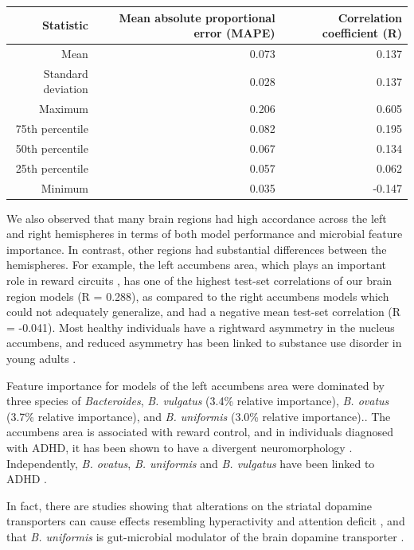 \documentclass{article}
\begin{document}
\begin{table}
    \begin{tabular}{rrr}
      \hline\hline
      \textbf{Statistic} & \textbf{Mean absolute proportional error (MAPE)} & \textbf{Correlation coefficient (R)} \\\hline
      Mean & 0.073 & 0.137 \\
      Standard deviation & 0.028 & 0.137 \\
      Maximum & 0.206 & 0.605 \\
      75th percentile & 0.082 & 0.195 \\
      50th percentile & 0.067 & 0.134 \\
      25th percentile & 0.057 & 0.062 \\
      Minimum & 0.035 & -0.147 \\\hline\hline
    \end{tabular}
\end{table}

We also observed that many brain regions had high accordance across the
left and right hemispheres in terms of both model performance and
microbial feature importance. In contrast, other regions had substantial
differences between the hemispheres. For example, the left accumbens
area, which plays an important role in reward circuits
\cite{ernstAmygdalaNucleusAccumbens2005,yauNucleusAccumbensResponse2012},
has one of the highest test-set correlations of our
brain region models (R = 0.288), as compared to the right accumbens
models which could not adequately generalize, and had a negative mean
test-set correlation (R = -0.041). Most healthy individuals have a
rightward asymmetry in the nucleus accumbens, and reduced asymmetry has
been linked to substance use disorder in young adults
\cite{caoMappingCorticalSubcortical2021}.

Feature importance for models of the left accumbens area were dominated
by three species of \emph{Bacteroides}, \emph{B. vulgatus} (3.4\%
relative importance), \emph{B. ovatus} (3.7\% relative importance), and
\emph{B. uniformis} (3.0\% relative importance).. The accumbens area is
associated with reward control, and in individuals diagnosed with ADHD,
it has been shown to have a divergent neuromorphology
\cite{hoogmanSubcorticalBrainVolume2017}.
Independently, \emph{B. ovatus}, \emph{B. uniformis} and
\emph{B. vulgatus} have been linked to ADHD
\cite{wangGutMicrobiotaDietary2020}.

In fact, there are studies showing that alterations on the striatal
dopamine transporters can cause effects resembling hyperactivity and
attention deficit
\cite{yaelDisinhibitionNucleusAccumbens2019},
and that \emph{B. uniformis} is gut-microbial modulator of the brain
dopamine transporter
\cite{hartstraInfusionDonorFeces2020}.
\end{document}
